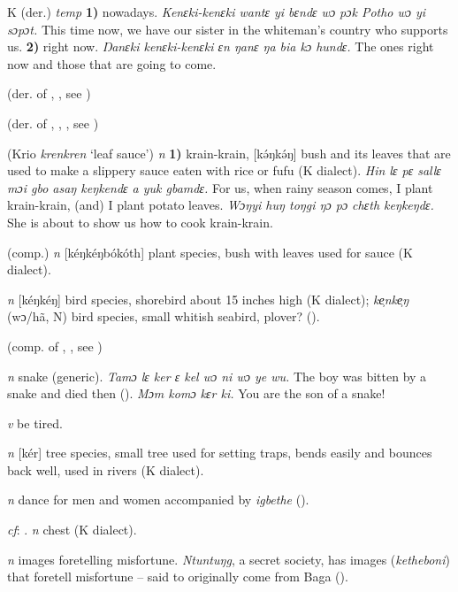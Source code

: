 \begin{letter}{K}
 (der.) \textit{temp} \textbf{1)} nowadays. \textit{Kenɛki-kenɛki wantɛ yi bɛndɛ wɔ pɔk Potho wɔ yi sɔpɔt.} This time now, we have our sister in the whiteman's country who supports us. \textbf{2)} right now. \textit{Ŋanɛki kenɛki-kenɛki ɛn ŋanɛ ŋa bia kɔ hundɛ.} The ones right now and those that are going to come.

 (der. of , , see ) 

 (der. of , , , see ) 

 (Krio \textit{krenkren} ‘leaf sauce') \textit{n} \textbf{1)} krain-krain, [kǝ́ŋkǝ́ŋ] bush and its leaves that are used to make a slippery sauce eaten with rice or fufu (K dialect). \textit{Hin lɛ pɛ sallɛ mɔi gbo asaŋ keŋkendɛ a yuk gbamdɛ.} For us, when rainy season comes, I plant krain-krain, (and) I plant potato leaves. \textit{Wɔŋyi huŋ toŋgi ŋɔ pɔ chɛth keŋkeŋdɛ.} She is about to show us how to cook krain-krain.

 (comp.) \textit{n} [kéŋkéŋbókóth] plant species, bush with leaves used for sauce (K dialect).

 \textit{n} [kéŋkéŋ] bird species, shorebird about 15 inches high (K dialect); \textit{ke̹nke̹ŋ} (wɔ/hã, N) bird species, small whitish seabird, plover? (\citealt{Pichl1967}). 

 (comp. of , , see ) 

 \textit{n} snake (generic). \textit{Tamɔ lɛ ker ɛ kel wɔ ni wɔ ye wu.} The boy was bitten by a snake and died then (\citealt{Pichl1967}). \textit{Mɔm komɔ kɛr ki.} You are the son of a snake!

 \textit{v} be tired.

 \textit{n} [kér] tree species, small tree used for setting traps, bends easily and bounces back well, used in rivers (K dialect).

 \textit{n} dance for men and women accompanied by \textit{igbethe} (\citealt{Pichl1967}). 

 \textit{cf}: . \textit{n} chest (K dialect). 

 \textit{n} images foretelling misfortune. \textit{Ntuntuŋg}, a secret society, has images (\textit{ketheboni}) that foretell misfortune – said to originally come from Baga (\citealt{Hall1938}). 


\end{letter}
